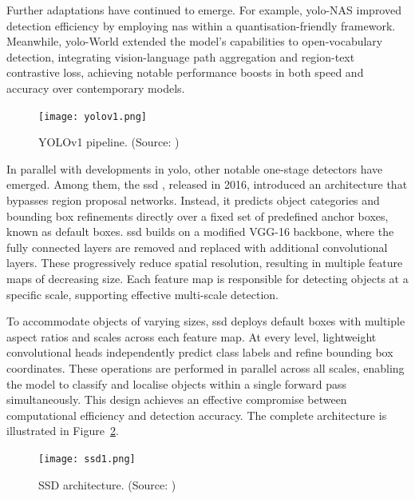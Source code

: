 Further adaptations have continued to emerge. For example, \gls{yolo}-NAS \cite{yolonas} improved detection efficiency by employing \gls{nas} within a quantisation-friendly framework. Meanwhile, \gls{yolo}-World \cite{yoloworld} extended the model’s capabilities to open-vocabulary detection, integrating vision-language path aggregation and region-text contrastive loss, achieving notable performance boosts in both speed and accuracy over contemporary models.

\begin{figure}[ht]
    \centering
    \texttt{[image: yolov1.png]}
    \caption{YOLOv1 pipeline. (Source: \cite{yolo})}
    \label{fig:yolov1}
\end{figure}

In parallel with developments in \gls{yolo}, other notable one-stage detectors have emerged. Among them, the \gls{ssd} \cite{ssd}, released in 2016, introduced an architecture that bypasses region proposal networks. Instead, it predicts object categories and bounding box refinements directly over a fixed set of predefined anchor boxes, known as default boxes.
\gls{ssd} builds on a modified VGG-16 backbone, where the fully connected layers are removed and replaced with additional convolutional layers. These progressively reduce spatial resolution, resulting in multiple feature maps of decreasing size. Each feature map is responsible for detecting objects at a specific scale, supporting effective multi-scale detection.

To accommodate objects of varying sizes, \gls{ssd} deploys default boxes with multiple aspect ratios and scales across each feature map. At every level, lightweight convolutional heads independently predict class labels and refine bounding box coordinates. These operations are performed in parallel across all scales, enabling the model to classify and localise objects within a single forward pass simultaneously. This design achieves an effective compromise between computational efficiency and detection accuracy. The complete architecture is illustrated in Figure~\ref{fig:ssd}.

\begin{figure}[!htbp]
\centering
\texttt{[image: ssd1.png]}
\caption{SSD architecture. (Source: \cite{ssd})}
\label{fig:ssd}
\end{figure}

